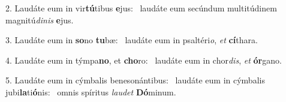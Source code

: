 2. Laudáte eum in vir\textbf{tú}tibus \textbf{e}jus: \ast\  laudáte eum secúndum multitúdinem magnitú\textit{di}\textit{nis} \textbf{e}jus.\

3. Laudáte eum in \textbf{so}no \textbf{tu}bæ: \ast\  laudáte eum in psaltéri\textit{o}, \textit{et} \textbf{cí}thara.\

4. Laudáte eum in týmpa\textbf{no}, et \textbf{cho}ro: \ast\  laudáte eum in chor\textit{dis}, \textit{et} \textbf{ór}gano.\

5. Laudáte eum in cýmbalis benesonántibus: \dag\  laudáte eum in cýmbalis jubi\textbf{la}ti\textbf{ó}nis: \ast\  omnis spíritus \textit{lau}\textit{det} \textbf{Dó}minum.\


